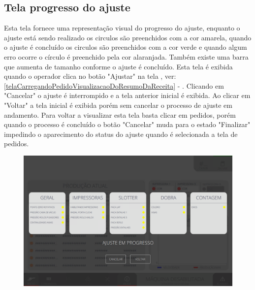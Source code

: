 \pagestyle{fancy}
\vspace*{40 pt}

\subsection{Tela progresso do ajuste}

Esta tela fornece uma representação visual do progresso do ajuste, enquanto o ajuste está sendo realizado os circulos são preenchidos com a cor amarela, quando o ajuste 
é concluído os circulos são preenchidos com a cor verde e quando algum erro ocorre o círculo é preenchido pela cor alaranjada. Também existe uma barra que aumenta de tamanho
conforme o ajuste é concluído.
Esta tela é exibida quando o operador clica no botão "Ajustar" na tela  , ver: \ref{telaCarregandoPedidoVisualizacaoDoResumoDaReceita} - 
. Clicando em "Cancelar" o ajuste é interrompido e a tela anterior inicial é exibida. Ao clicar em "Voltar" a tela inicial é 
exibida porém sem cancelar o processo de ajuste em andamento. Para voltar a visualizar esta tela basta clicar em pedidos, porém quando o processo é concluído o botão "Cancelar" 
muda para o estado "Finalizar" impedindo o aparecimento do status do ajuste quando é selecionada a tela de pedidos.

\vspace*{\fill}
\begin{figure}[h]
    \centering
    \includegraphics[width=480 px,height=300 px]{src/imagesFlexo/15-setupProgress/1.png}
\end{figure}
\vspace*{\fill}